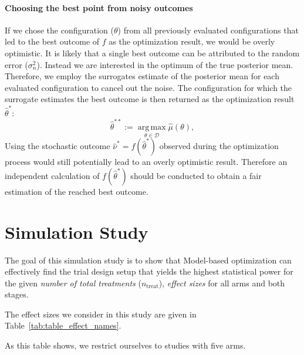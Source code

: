 \documentclass[bimj,fleqn]{w-art}
\theoremstyle{plain}
\theoremstyle{definition}
\begin{document}
\paragraph{Choosing the best point from noisy outcomes}
If we chose the configuration ($\theta$) from all previously evaluated configurations that led to the best outcome of $f$ as the optimization result, we would be overly optimistic.
It is likely that a single best outcome can be attributed to the random error ($\sigma_{n}^2$).
Instead we are interested in the optimum of the true posterior mean.
Therefore, we employ the surrogates estimate of the posterior mean for each evaluated configuration to cancel out the noise.
The configuration for which the surrogate estimates the best outcome is then returned as the optimization result $\hat{\theta}^\ast$:
\begin{equation}
  \hat{\theta}^{\ast\ast} := \operatorname{arg\,max}\limits_{\theta \in \mathcal{D}} \hat{\mu}(\theta),
\end{equation}
Using the stochastic outcome $\hat{\nu}^\ast = f(\hat{\theta}^\ast) $ observed during the optimization process would still potentially lead to an overly optimistic result.
Therefore an independent calculation of $f(\hat{\theta}^\ast)$ should be conducted to obtain a fair estimation of the reached best outcome.

\section{Simulation Study}
\label{sec:simulation_study}


The goal of this simulation study is to show that Model-based optimization can effectively find the trial design setup that yields the highest statistical power for the given \emph{number of total treatments} ($n_{\text{treat}}$), \emph{effect sizes} for all arms and both stages.

The effect sizes we consider in this study are given in Table~\ref{tab:table_effect_names}.

As this table shows, we restrict ourselves to studies with five arms.
\end{document}

